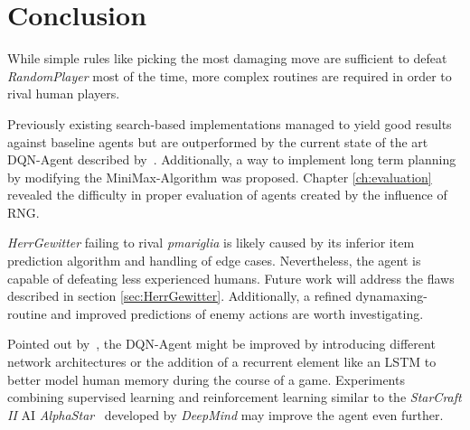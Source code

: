 
\chapter{Conclusion}
\label{ch:conclusion}

While simple rules like picking the most damaging move are sufficient to defeat 
\textit{RandomPlayer} most of the time, more complex routines are required 
in order to rival human players. 

Previously existing search-based implementations managed to yield good results against 
baseline agents but are outperformed by the current state of the art DQN-Agent 
described by~\cite{Huang_Lee_2019}. 
Additionally, a way to implement long term planning by modifying the MiniMax-Algorithm
was proposed. Chapter \ref{ch:evaluation} revealed the difficulty in proper evaluation
of agents created by the influence of \ac{RNG}. 

\textit{HerrGewitter} failing to rival \textit{pmariglia} is likely caused by its inferior
item prediction algorithm and handling of edge cases. Nevertheless, the agent is capable
of defeating less experienced humans. Future work will address the flaws described in
section \ref{sec:HerrGewitter}. Additionally, a refined dynamaxing-routine and improved
predictions of enemy actions are worth investigating.

Pointed out by~\cite{Huang_Lee_2019}, the DQN-Agent might be improved
by introducing \grqq different network architectures or the addition
of a recurrent element like an LSTM to better model human memory during the 
course of a game\grqq. Experiments combining supervised learning and
reinforcement learning similar to the \textit{StarCraft II} AI \textit{AlphaStar}~\autocite{OpenAI:AlphaStar}
developed by \textit{DeepMind} may improve the agent even further. 